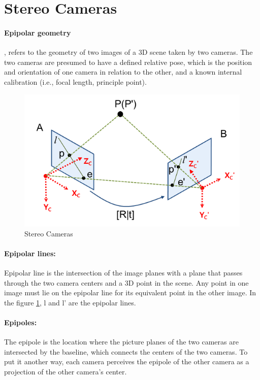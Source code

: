 \documentclass[11pt]{article}
\begin{document}
    \section{Stereo Cameras}

    \paragraph{Epipolar geometry}, refers to the geometry of two images of a 3D scene taken
    by two cameras. The two cameras are presumed to have a defined relative pose, which is
    the position and orientation of one camera in relation to the other, and a known internal calibration
    (i.e., focal length, principle point).

    \begin{figure}
        \centering
        \includegraphics[width=\textwidth,height=\textheight,keepaspectratio]{images/epipolar_1.png}
        \caption{Stereo Cameras}
        \label{fig:stereo_cameras}
    \end{figure}


    \paragraph{Epipolar lines:} Epipolar line is the intersection of the image planes with a plane that
    passes through the two camera centers and a 3D point in the scene. Any point in one image must lie on
    the epipolar line for its equivalent point in the other image. In the figure \ref{fig:stereo_cameras}, l and l' are the epipolar lines.

    \paragraph{Epipoles:} The epipole is the location where the picture planes of the two cameras are
    intersected by the baseline, which connects the centers of the two cameras. To put it another way,
    each camera perceives the epipole of the other camera as a projection of the other camera's center.
    
\end{document}
